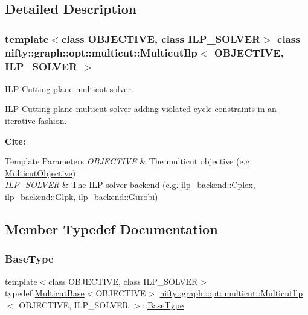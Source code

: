\subsection{Detailed Description}
\subsubsection*{template$<$class O\+B\+J\+E\+C\+T\+I\+VE, class I\+L\+P\+\_\+\+S\+O\+L\+V\+ER$>$\newline
class nifty\+::graph\+::opt\+::multicut\+::\+Multicut\+Ilp$<$ O\+B\+J\+E\+C\+T\+I\+V\+E, I\+L\+P\+\_\+\+S\+O\+L\+V\+E\+R $>$}

I\+LP Cutting plane multicut solver. 

I\+LP Cutting plane multicut solver adding violated cycle constraints in an iterative fashion.

{\bfseries Cite\+:} \cite{Kappes-2011} \cite{andres_2011_probabilistic}


\begin{DoxyTemplParams}{Template Parameters}
{\em O\+B\+J\+E\+C\+T\+I\+VE} & The multicut objective (e.\+g. \hyperlink{classnifty_1_1graph_1_1opt_1_1multicut_1_1MulticutObjective}{Multicut\+Objective}) \\
\hline
{\em I\+L\+P\+\_\+\+S\+O\+L\+V\+ER} & The I\+LP solver backend (e.\+g. \hyperlink{classnifty_1_1ilp__backend_1_1Cplex}{ilp\+\_\+backend\+::\+Cplex}, \hyperlink{classnifty_1_1ilp__backend_1_1Glpk}{ilp\+\_\+backend\+::\+Glpk}, \hyperlink{classnifty_1_1ilp__backend_1_1Gurobi}{ilp\+\_\+backend\+::\+Gurobi}) \\
\hline
\end{DoxyTemplParams}


\subsection{Member Typedef Documentation}
\mbox{\label{classnifty_1_1graph_1_1opt_1_1multicut_1_1MulticutIlp_ab44311fd7237175157306abd3325825a}} 
\subsubsection{\texorpdfstring{Base\+Type}{BaseType}}
{\footnotesize\ttfamily template$<$class O\+B\+J\+E\+C\+T\+I\+VE, class I\+L\+P\+\_\+\+S\+O\+L\+V\+ER$>$ \\
typedef \hyperlink{classnifty_1_1graph_1_1opt_1_1multicut_1_1MulticutBase}{Multicut\+Base}$<$O\+B\+J\+E\+C\+T\+I\+VE$>$ \hyperlink{classnifty_1_1graph_1_1opt_1_1multicut_1_1MulticutIlp}{nifty\+::graph\+::opt\+::multicut\+::\+Multicut\+Ilp}$<$ O\+B\+J\+E\+C\+T\+I\+VE, I\+L\+P\+\_\+\+S\+O\+L\+V\+ER $>$\+::\hyperlink{classnifty_1_1graph_1_1opt_1_1multicut_1_1MulticutIlp_ab44311fd7237175157306abd3325825a}{Base\+Type}}



